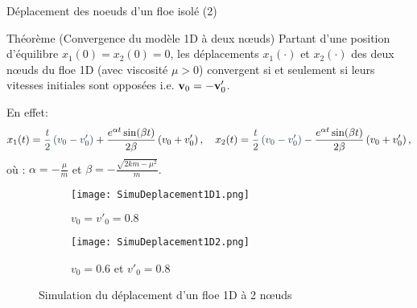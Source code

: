 \begin{frame}[fragile]{Déplacement des noeuds d’un floe isolé (2)}

		

    
    \large
    \begin{exampleblock}{Théorème (Convergence du modèle 1D à deux n\oe{}uds) \parencite{nzoyem2021thesis}}
        Partant d'une position d'équilibre $x_1(0) = x_2(0) = 0$, les déplacements $x_1(\cdot)$ et $x_2(\cdot)$ des deux n\oe{}uds du floe 1D (avec viscosité $\mu > 0$) convergent  si et seulement si leurs vitesses initiales sont opposées i.e. $\bm{\mathrm{v}}_0 = - \bm{\mathrm{v}}'_0$.
    \end{exampleblock}
    \normalsize
    En effet:
    \begin{align*}
        x_1(t) = \textcolor{myblack2}{\frac{t}{2}\left( v_0 - v'_0 \right)} + \frac{e^{\alpha t} \sin(\beta t)}{2\beta} \left( v_0 + v'_0 \right), \quad x_2(t) = \textcolor{myblack2}{\frac{t}{2}\left( v_0 - v'_0 \right)} - \frac{e^{\alpha t} \sin(\beta t)}{2\beta} \left( v_0 + v'_0 \right),
    \end{align*}
    où : $\alpha = -\frac{\mu}{m}$ et $\beta = -\frac{\sqrt{2km - \mu^2}}{m}$.
    \begin{figure}[!h]
        \centering
        \begin{subfigure}[t]{0.48\textwidth}
            \centering
            \texttt{[image: SimuDeplacement1D1.png]}
            \caption{$v_0=v'_0 = 0.8$}
        \end{subfigure}
        \begin{subfigure}[t]{0.48\textwidth}
            \centering
            \texttt{[image: SimuDeplacement1D2.png]}
            \caption{$v_0= 0.6$ et $v'_0 = 0.8$}
        \end{subfigure}    
        \caption{Simulation du déplacement d'un floe 1D à 2 n\oe{}uds}
    \end{figure}


\end{frame}
